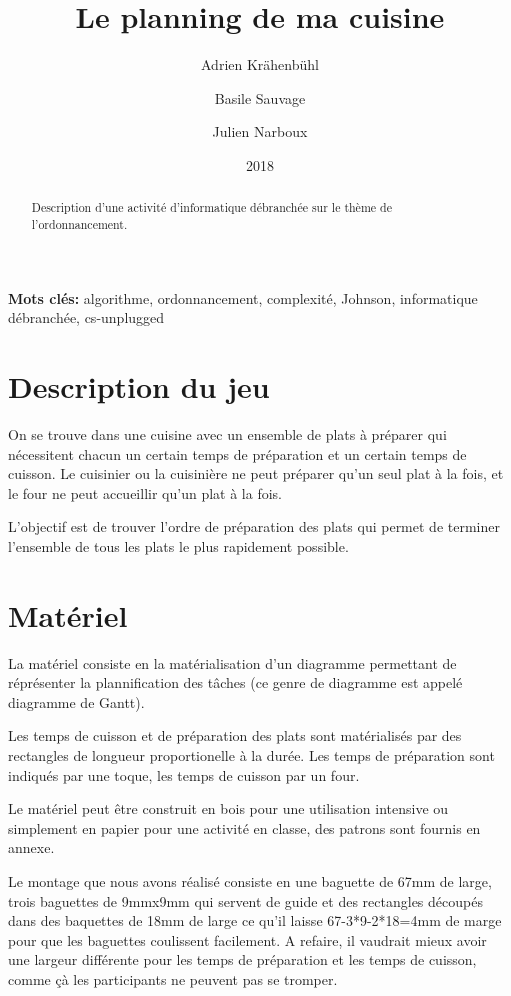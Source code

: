 \documentclass[a4paper]{article}
\title{Le planning de ma cuisine}
\author{Adrien Krähenbühl \and Basile Sauvage \and Julien Narboux}
\date{2018}
\begin{document}
\maketitle

\begin{abstract}
Description d'une activité d'informatique débranchée sur le thème de l'ordonnancement.
\end{abstract}

\smallskip

\textbf{Mots clés:} algorithme, ordonnancement, complexité, Johnson, informatique débranchée, cs-unplugged

\section{Description du jeu}

On se trouve dans une cuisine avec un ensemble de plats à préparer qui nécessitent chacun un certain temps de préparation et un certain temps de cuisson. Le cuisinier ou la cuisinière ne peut préparer qu'un seul plat à la fois, et le four ne peut accueillir qu'un plat à la fois.

L'objectif est de trouver l'ordre de préparation des plats qui permet de terminer l'ensemble de tous les plats le plus rapidement possible.

\section{Matériel}

La matériel consiste en la matérialisation d'un diagramme permettant de réprésenter la plannification des tâches (ce genre de diagramme est appelé diagramme de Gantt).

Les temps de cuisson et de préparation des plats sont matérialisés par des rectangles de longueur proportionelle à la durée. Les temps de préparation sont indiqués par une toque, les temps de cuisson par un four.

Le matériel peut être construit en bois pour une utilisation intensive ou simplement en papier pour une activité en classe, des patrons sont fournis en annexe.

Le montage que nous avons réalisé consiste en une baguette de 67mm de large, trois baguettes de 9mmx9mm qui servent de guide et des rectangles découpés dans des baquettes de 18mm de large ce qu'il laisse 67-3*9-2*18=4mm de marge pour que les baguettes coulissent facilement. A refaire, il vaudrait mieux avoir une largeur différente pour les temps de préparation et les temps de cuisson, comme çà les participants ne peuvent pas se tromper.
\end{document}
